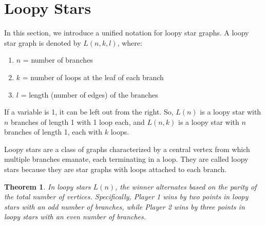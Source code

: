 \documentclass{article}
\newtheorem{theorem}{Theorem}
\begin{document}
\section{Loopy Stars}

In this section, we introduce a unified notation for loopy star graphs. A loopy star graph is denoted by $L(n, k, l)$, where:

\begin{enumerate}
    \item $n$ = number of branches
    \item $k$ = number of loops at the leaf of each branch
    \item $l$ = length (number of edges) of the branches
\end{enumerate}

If a variable is 1, it can be left out from the right. So, $L(n)$ is a loopy star with $n$ branches of length 1 with 1 loop each, and $L(n, k)$ is a loopy star with $n$ branches of length 1, each with $k$ loops.

Loopy stars are a class of graphs characterized by a central vertex from which multiple branches emanate, each terminating in a loop. They are called loopy stars because they are star graphs with loops attached to each branch.

\begin{theorem}
In loopy stars $L(n)$, the winner alternates based on the parity of the total number of vertices. Specifically, Player 1 wins by two points in loopy stars with an odd number of branches, while Player 2 wins by three points in loopy stars with an even number of branches.
\end{theorem}
\end{document}
